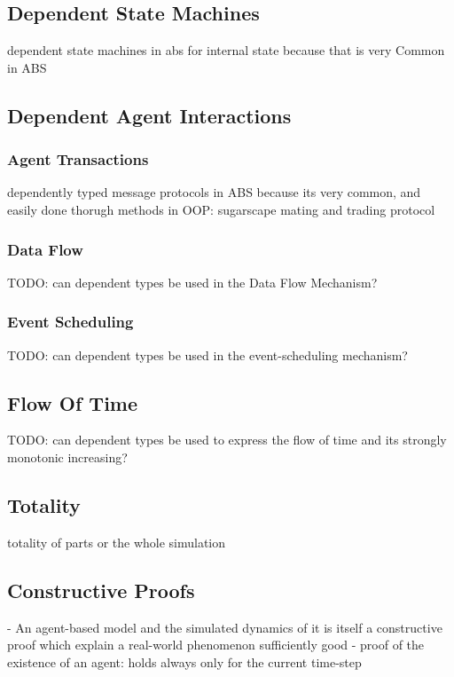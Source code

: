 \subsection{Dependent State Machines}
dependent state machines in abs for internal state because that is very Common in ABS

\subsection{Dependent Agent Interactions}
\subsubsection{Agent Transactions}
dependently typed message protocols in ABS because its very common, and easily done thorugh methods in OOP: sugarscape mating and trading protocol
\subsubsection{Data Flow}
TODO: can dependent types be used in the Data Flow Mechanism?
\subsubsection{Event Scheduling}
TODO: can dependent types be used in the event-scheduling mechanism?

\subsection{Flow Of Time}
TODO: can dependent types be used to express the flow of time and its strongly monotonic increasing?

\subsection{Totality}
totality of parts or the whole simulation

\subsection{Constructive Proofs}
- An agent-based model and the simulated dynamics of it is itself a constructive proof which explain a real-world phenomenon sufficiently good
- proof of the existence of an agent: holds always only for the current time-step